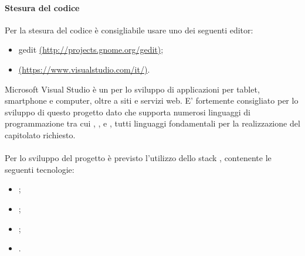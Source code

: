 \paragraph{Stesura del codice}
Per la stesura del codice è consigliabile usare uno dei seguenti editor:
\begin{itemize}
\item gedit \href{http://projects.gnome.org/gedit}{(http://projects.gnome.org/gedit)};
\item {} \href{https://www.visualstudio.com/it/}{(https://www.visualstudio.com/it/)}.
\end{itemize}

Microsoft Visual Studio è un  per lo sviluppo di applicazioni per tablet, smartphone e computer, oltre a siti e servizi web. E' fortemente consigliato per lo sviluppo di questo progetto dato che supporta numerosi linguaggi di programmazione tra cui , ,  e , tutti linguaggi fondamentali per la realizzazione del capitolato richiesto.

\paragraph{}
Per lo sviluppo del progetto è previsto l'utilizzo dello stack , contenente le seguenti tecnologie:
\begin{itemize}
\item {};
\item {};
\item {};
\item {}.
\end{itemize}
